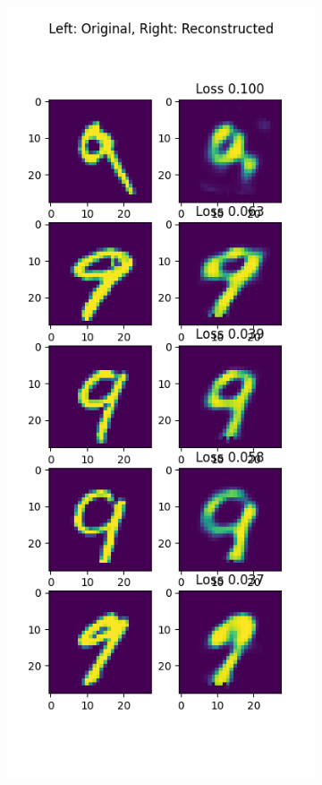 \begin{solve}
\begin{figure}[H]
\begin{subfigure}{.5\textwidth}
              \end{subfigure}%
              \begin{subfigure}{.5\textwidth}
                \centering
                \includegraphics[width=.9\linewidth]{plots/output_9.png}
              \end{subfigure}
              \end{figure}
            
\end{solve}